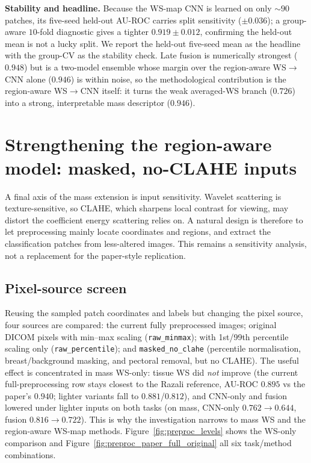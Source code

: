 \textbf{Stability and headline.} Because the WS-map CNN is learned on only ${\sim}90$ patches, its five-seed held-out AU-ROC carries split sensitivity ($\pm0.036$); a group-aware $10$-fold diagnostic gives a tighter $0.919 \pm 0.012$, confirming the held-out mean is not a lucky split. We report the held-out five-seed mean as the headline with the group-CV as the stability check. Late fusion is numerically strongest ($0.948$) but is a two-model ensemble whose margin over the region-aware WS$\rightarrow$CNN alone ($0.946$) is within noise, so the methodological contribution is the region-aware WS$\rightarrow$CNN itself: it turns the weak averaged-WS branch ($0.726$) into a strong, interpretable mass descriptor ($0.946$).

\section{Strengthening the region-aware model: masked, no-CLAHE inputs} \label{sec:region_noclahe}

A final axis of the mass extension is input sensitivity. Wavelet scattering is texture-sensitive, so CLAHE, which sharpens local contrast for viewing, may distort the coefficient energy scattering relies on. A natural design is therefore to let preprocessing mainly locate coordinates and regions, and extract the classification patches from less-altered images. This remains a sensitivity analysis, not a replacement for the paper-style replication.

\subsection*{Pixel-source screen}
Reusing the sampled patch coordinates and labels but changing the pixel source, four sources are compared: the current fully preprocessed images; original DICOM pixels with min--max scaling (\texttt{raw\_minmax}); with 1st/99th percentile scaling only (\texttt{raw\_percentile}); and \texttt{masked\_no\_clahe} (percentile normalisation, breast/background masking, and pectoral removal, but no CLAHE). The useful effect is concentrated in mass WS-only: tissue WS did \emph{not} improve (the current full-preprocessing row stays closest to the Razali reference, AU-ROC $0.895$ vs the paper's $0.940$; lighter variants fall to $0.881$/$0.812$), and CNN-only and fusion lowered under lighter inputs on both tasks (on mass, CNN-only $0.762\to0.644$, fusion $0.816\to0.722$). This is why the investigation narrows to mass WS and the region-aware WS-map methods. Figure~\ref{fig:preproc_levels} shows the WS-only comparison and Figure~\ref{fig:preproc_paper_full_original} all six task/method combinations.

